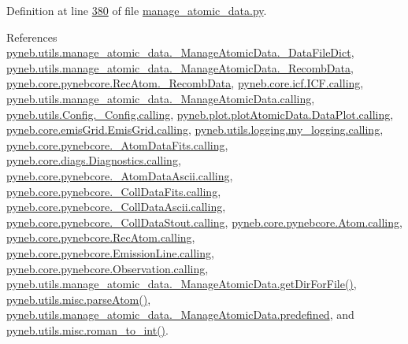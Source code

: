 Definition at line \hyperlink{manage__atomic__data_8py_source_l00380}{380} of file \hyperlink{manage__atomic__data_8py_source}{manage\-\_\-atomic\-\_\-data.\-py}.



References \hyperlink{manage__atomic__data_8py_source_l00078}{pyneb.\-utils.\-manage\-\_\-atomic\-\_\-data.\-\_\-\-Manage\-Atomic\-Data.\-\_\-\-Data\-File\-Dict}, \hyperlink{manage__atomic__data_8py_source_l00025}{pyneb.\-utils.\-manage\-\_\-atomic\-\_\-data.\-\_\-\-Manage\-Atomic\-Data.\-\_\-\-Recomb\-Data}, \hyperlink{pynebcore_8py_source_l02731}{pyneb.\-core.\-pynebcore.\-Rec\-Atom.\-\_\-\-Recomb\-Data}, \hyperlink{icf_8py_source_l00016}{pyneb.\-core.\-icf.\-I\-C\-F.\-calling}, \hyperlink{manage__atomic__data_8py_source_l00018}{pyneb.\-utils.\-manage\-\_\-atomic\-\_\-data.\-\_\-\-Manage\-Atomic\-Data.\-calling}, \hyperlink{_config_8py_source_l00032}{pyneb.\-utils.\-Config.\-\_\-\-Config.\-calling}, \hyperlink{plot_atomic_data_8py_source_l00042}{pyneb.\-plot.\-plot\-Atomic\-Data.\-Data\-Plot.\-calling}, \hyperlink{emis_grid_8py_source_l00044}{pyneb.\-core.\-emis\-Grid.\-Emis\-Grid.\-calling}, \hyperlink{logging_8py_source_l00044}{pyneb.\-utils.\-logging.\-my\-\_\-logging.\-calling}, \hyperlink{pynebcore_8py_source_l00097}{pyneb.\-core.\-pynebcore.\-\_\-\-Atom\-Data\-Fits.\-calling}, \hyperlink{diags_8py_source_l00169}{pyneb.\-core.\-diags.\-Diagnostics.\-calling}, \hyperlink{pynebcore_8py_source_l00318}{pyneb.\-core.\-pynebcore.\-\_\-\-Atom\-Data\-Ascii.\-calling}, \hyperlink{pynebcore_8py_source_l00585}{pyneb.\-core.\-pynebcore.\-\_\-\-Coll\-Data\-Fits.\-calling}, \hyperlink{pynebcore_8py_source_l00936}{pyneb.\-core.\-pynebcore.\-\_\-\-Coll\-Data\-Ascii.\-calling}, \hyperlink{pynebcore_8py_source_l01156}{pyneb.\-core.\-pynebcore.\-\_\-\-Coll\-Data\-Stout.\-calling}, \hyperlink{pynebcore_8py_source_l01229}{pyneb.\-core.\-pynebcore.\-Atom.\-calling}, \hyperlink{pynebcore_8py_source_l02643}{pyneb.\-core.\-pynebcore.\-Rec\-Atom.\-calling}, \hyperlink{pynebcore_8py_source_l03385}{pyneb.\-core.\-pynebcore.\-Emission\-Line.\-calling}, \hyperlink{pynebcore_8py_source_l03541}{pyneb.\-core.\-pynebcore.\-Observation.\-calling}, \hyperlink{manage__atomic__data_8py_source_l00144}{pyneb.\-utils.\-manage\-\_\-atomic\-\_\-data.\-\_\-\-Manage\-Atomic\-Data.\-get\-Dir\-For\-File()}, \hyperlink{misc_8py_source_l00159}{pyneb.\-utils.\-misc.\-parse\-Atom()}, \hyperlink{manage__atomic__data_8py_source_l00084}{pyneb.\-utils.\-manage\-\_\-atomic\-\_\-data.\-\_\-\-Manage\-Atomic\-Data.\-predefined}, and \hyperlink{misc_8py_source_l00095}{pyneb.\-utils.\-misc.\-roman\-\_\-to\-\_\-int()}.



